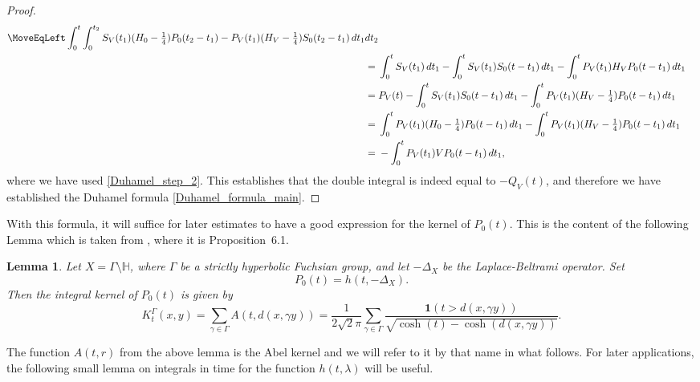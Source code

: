 \documentclass[11pt,twoside,reqno]{amsart}
\newcommand{\bH}{\mathbb{H}}
\newcommand{\1}{\mathrm{\mathbf{1}}}
\numberwithin{equation}{section}
\theoremstyle{plain}
\newtheorem{lemma}[thm]{Lemma}
\theoremstyle{definition}
\theoremstyle{remark}
\begin{document}
\begin{proof}
\begin{equation*}
    \begin{aligned}
       \MoveEqLeft \int_{0}^{t} \int_{0}^{t_2} S_V(t_1) (H_0-\tfrac14) P_0(t_2-t_1) - P_V(t_1) (H_V-\tfrac14) S_0(t_2-t_1) \,  dt_1 dt_2
       \\
       ={}& \int_{0}^{t} S_V(t_1) \,dt_1 - \int_0^t S_V(t_1) S_0(t-t_1) \, dt_1  - \int_{0}^{t} P_V(t_1) H_V P_0(t-t_1) \, dt_1 
       \\
       ={}&P_V(t) - \int_0^t S_V(t_1) S_0(t-t_1) \, dt_1  - \int_{0}^{t} P_V(t_1) (H_V-\tfrac14) P_0(t-t_1) \, dt_1 
       \\
       ={}& \int_{0}^{t} P_V(t_1) (H_0-\tfrac14) P_0(t-t_1)  \, dt_1 - \int_{0}^{t} P_V(t_1) (H_V-\tfrac14) P_0(t-t_1) \, dt_1 
       \\
       ={}& -\int_{0}^{t} P_V(t_1) V P_0(t-t_1)  \, dt_1,
    \end{aligned}
\end{equation*}
where we have used \eqref{Duhamel_step_2}. This establishes that the double integral is indeed equal to $-Q_V(t)$, and therefore we have established the Duhamel formula \eqref{Duhamel_formula_main}.   
\end{proof}

With this formula, it will suffice for later estimates to have a good expression for the kernel of $P_0(t)$. This is the content of the following Lemma which is taken from \cite{Hippi}, where it is Proposition~{6.1}. 
\begin{lemma}\label{LE:kernel_of_unper_pro}
    Let $X=\Gamma\setminus \bH$, where $\Gamma$ be a strictly hyperbolic Fuchsian group, and let $-\Delta_X$ be the Laplace-Beltrami operator. Set
    \begin{equation*}
        P_0(t) = h(t,-\Delta_X).
    \end{equation*}
    Then the integral kernel of $P_0(t)$ is given by
    \begin{equation*}
        K^\Gamma_{t}(x,y)= \sum_{\gamma \in \Gamma} A(t,d(x,\gamma y)) =\frac{1}{2\sqrt{2} \pi} \sum_{\gamma \in \Gamma} \frac{\boldsymbol{1}(t> d(x,\gamma y))}{\sqrt{\cosh(t) - \cosh(d(x,\gamma y))}}.
    \end{equation*}
\end{lemma}
The function $A(t,r)$ from the above lemma is the Abel kernel and we will refer to it by that name in what follows. For later applications, the following small lemma on integrals in time for the function $h(t,\lambda)$ will be useful.
\end{document}
